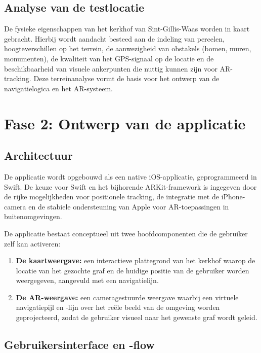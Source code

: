 \subsection{Analyse van de testlocatie}

De fysieke eigenschappen van het kerkhof van Sint-Gillis-Waas worden in kaart gebracht. Hierbij wordt aandacht besteed aan de indeling van percelen, hoogteverschillen op het terrein, de aanwezigheid van obstakels (bomen, muren, monumenten), de kwaliteit van het GPS-signaal op de locatie en de beschikbaarheid van visuele ankerpunten die nuttig kunnen zijn voor AR-tracking. Deze terreinanalyse vormt de basis voor het ontwerp van de navigatielogica en het AR-systeem.

\section{Fase 2: Ontwerp van de applicatie}

\subsection{Architectuur}

De applicatie wordt opgebouwd als een native iOS-applicatie, geprogrammeerd in Swift. De keuze voor Swift en het bijhorende ARKit-framework is ingegeven door de rijke mogelijkheden voor positionele tracking, de integratie met de iPhone-camera en de stabiele ondersteuning van Apple voor AR-toepassingen in buitenomgevingen.

De applicatie bestaat conceptueel uit twee hoofdcomponenten die de gebruiker zelf kan activeren:

\begin{enumerate}
    \item \textbf{De kaartweergave:} een interactieve plattegrond van het kerkhof waarop de locatie van het gezochte graf en de huidige positie van de gebruiker worden weergegeven, aangevuld met een navigatielijn.
    \item \textbf{De AR-weergave:} een cameragestuurde weergave waarbij een virtuele navigatiepijl en -lijn over het reële beeld van de omgeving worden geprojecteerd, zodat de gebruiker visueel naar het gewenste graf wordt geleid.
\end{enumerate}

\subsection{Gebruikersinterface en -flow}

